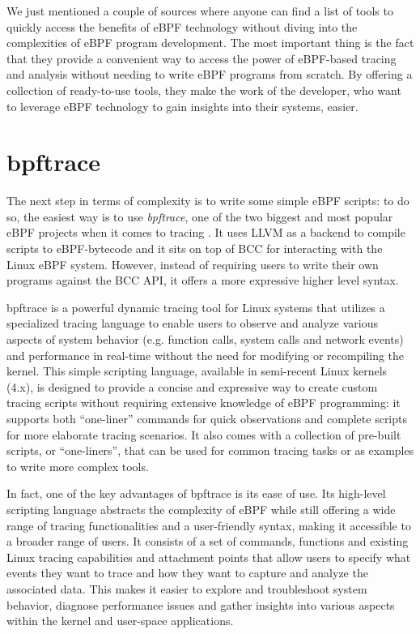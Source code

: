 We just mentioned a couple of sources where anyone can find a list of tools to quickly access the benefits of eBPF technology without diving into the complexities of eBPF program development.
The most important thing is the fact that they provide a convenient way to access the power of eBPF-based tracing and analysis without needing to write eBPF programs from scratch. 
By offering a collection of ready-to-use tools, they make the work of the developer, who want to leverage eBPF technology to gain insights into their systems, easier.

\section{bpftrace}

The next step in terms of complexity is to write some simple eBPF scripts: to do so, the easiest way is to use \textit{bpftrace}, one of the two biggest and most popular eBPF projects when it comes to tracing \cite{bpftraceRepo}.
It uses LLVM as a backend to compile scripts to eBPF-bytecode and it sits on top of BCC for interacting with the Linux eBPF system.
However, instead of requiring users to write their own programs against the BCC API, it offers a more expressive higher level syntax.

bpftrace is a powerful dynamic tracing tool for Linux systems that utilizes a specialized tracing language to enable users to observe and analyze various aspects of system behavior (e.g. function calls, system calls and network events) and performance in real-time without the need for modifying or recompiling the kernel.
This simple scripting language, available in semi-recent Linux kernels (4.x), is designed to provide a concise and expressive way to create custom tracing scripts without requiring extensive knowledge of eBPF programming: it supports both ``one-liner'' commands for quick observations and complete scripts for more elaborate tracing scenarios.
It also comes with a collection of pre-built scripts, or ``one-liners'', that can be used for common tracing tasks or as examples to write more complex tools. 

In fact, one of the key advantages of bpftrace is its ease of use. 
Its high-level scripting language abstracts the complexity of eBPF while still offering a wide range of tracing functionalities and a user-friendly syntax, making it accessible to a broader range of users. 
It consists of a set of commands, functions and existing Linux tracing capabilities and attachment points that allow users to specify what events they want to trace and how they want to capture and analyze the associated data.
This makes it easier to explore and troubleshoot system behavior, diagnose performance issues and gather insights into various aspects within the kernel and user-space applications.

